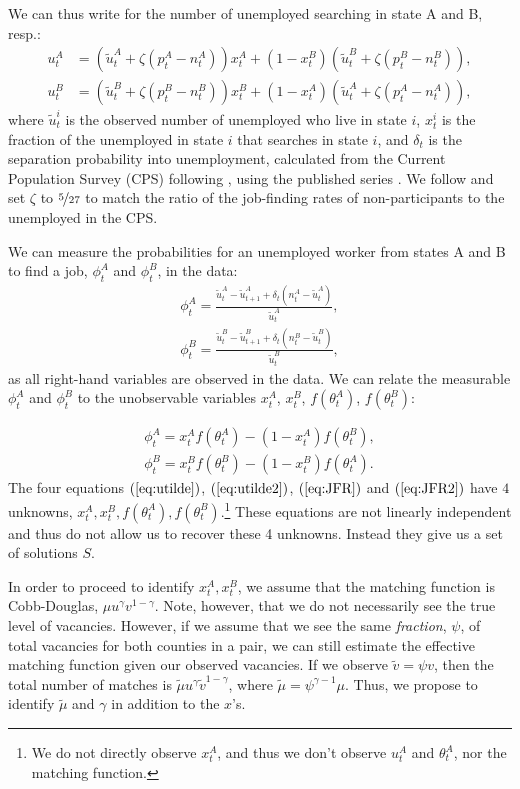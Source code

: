 \documentclass[12pt]{article}
\newcommand{\1}{\mathbf{1}}
\newcommand{\xat}{x^A_t}
\newcommand{\xbt}{x^B_t}
\newcommand{\tat}{\theta^A_t}
\newcommand{\tbt}{\theta^B_t}
\newcommand{\uat}{u^A_t}
\newcommand{\ubt}{u^B_t}
\newcommand{\uatt}{\tilde{u}^A_t}
\newcommand{\ubtt}{\tilde{u}^B_t}
\newcommand{\uattp}{\tilde{u}^A_{t+1}}
\newcommand{\ubttp}{\tilde{u}^B_{t+1}}
\newcommand{\nat}{n^A_t}
\newcommand{\nbt}{n^B_t}
\newcommand{\pat}{p^A_t}
\newcommand{\pbt}{p^B_t}
\begin{document}
\begin{appendix}
We can thus write for the number of unemployed searching in state A and B, resp.:
\begin{align} \label{eq:utilde}
\uat&=(\uatt+\zeta(\pat-\nat))\xat+(1-\xbt)(\ubtt+\zeta(\pbt-\nbt)),\\
\ubt&=(\ubtt+\zeta(\pbt-\nbt))\xbt+(1-\xat)(\uatt+\zeta(\pat-\nat)), \label{eq:utilde2}
\end{align}
where $\tilde{u}^{i}_{t}$ is the observed number of unemployed who live in state $i$, $x^{i}_{t}$ is the fraction of the unemployed in state $i$ that searches in state $i$, and $\delta_t$ is the separation probability into unemployment, calculated from the Current Population Survey (CPS) following \citet{shimer:05b}, using the published series \citep{data:shimer-flows}.  We follow \citet{hall:13} and set $\zeta$ to $\nicefrac{5}{27}$ to match the ratio of the job-finding rates of non-participants to the unemployed in the CPS.




We can measure the probabilities for an unemployed worker from states A and B to find a job, $\phi_t^A$ and $\phi_t^B$, in the data:
\begin{align} \label{eq:JFR_Data}
\phi_t^A = \frac{\uatt-\uattp+\delta_t \left(\nat-\uatt\right)}{\uatt} ,\\
\phi_t^B = \frac{\ubtt-\ubttp + \delta_t \left(\nbt-\ubtt\right) }{\ubtt},
\end{align}
as all right-hand variables are observed in the data.
We can relate the measurable $\phi_t^A$ and $\phi_t^B$ to the unobservable variables $\xat$, $\xbt$, $f(\tat)$, $f(\tbt)$:

\begin{align} \label{eq:JFR}
\phi_t^A = \xat f\left(\tat\right)-\left(1-\xat\right) f\left(\tbt\right),\\
\phi_t^B = \xbt f\left(\tbt\right)-\left(1-\xbt\right) f\left(\tat\right).\label{eq:JFR2}
\end{align}
The four equations $(\ref{eq:utilde})$, $(\ref{eq:utilde2})$, $(\ref{eq:JFR})$ and $(\ref{eq:JFR2})$ have $4$ unknowns, $\xat, \xbt, f(\tat), f(\tbt)$.\footnote{We do not directly observe $\xat$, and thus we don't observe $\uat$ and $\tat$, nor the matching function.} These equations are not linearly independent and thus do not allow us to recover these 4 unknowns. Instead they give us a set of solutions $S$.

In order to proceed to identify $\xat,\xbt$, we assume that the matching function is Cobb-Douglas, $\mu u^\gamma v^{1-\gamma}$.   Note, however, that we do not necessarily see the true level of vacancies.  However, if we assume that we see the same \textit{fraction}, $\psi$, of total vacancies for both counties in a pair, we can still estimate the effective matching function given our observed vacancies.  If we observe $\tilde{v}=\psi v$, then the total number of matches is $\tilde{\mu} u^\gamma \tilde{v}^{1-\gamma}$, where $\tilde{\mu}=\psi^{\gamma-1}\mu$.  Thus, we propose to identify $\tilde{\mu}$ and $\gamma$ in addition to the $x$'s.


\end{appendix}
\end{document}
